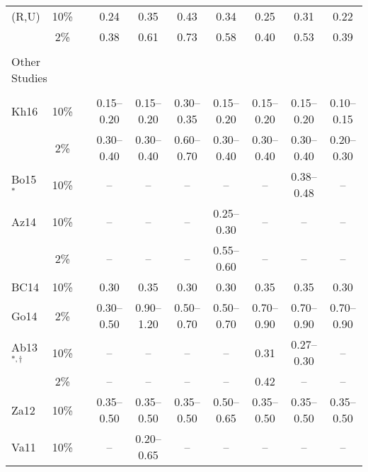 \begin{table*}[t]
\begin{tabular}{lccccccccc}
    (R,U)   &  10\%  &&   0.24      &   0.35      &   0.43      &   0.34      &   0.25      &   0.31      &   0.22      \\
            &   2\%  &&   0.38      &   0.61      &   0.73      &   0.58      &   0.40      &   0.53      &   0.39      \\
    \hline                                                                                                              \\[-1.6ex]
    \multicolumn{2}{l}{Other Studies}                                                                                   \\[0.6ex]
    \cline{1-2} \cline{4-10}                                                                                            \\[-1.6ex]
    Kh16    &  10\%  &&  0.15--0.20 & 0.15--0.20  & 0.30--0.35  & 0.15--0.20  & 0.15--0.20  & 0.15--0.20  & 0.10--0.15  \\
            &   2\%  &&  0.30--0.40 & 0.30--0.40  & 0.60--0.70  & 0.30--0.40  & 0.30--0.40  & 0.30--0.40  & 0.20--0.30  \\
    Bo15${}^{*}$
            &  10\%  &&   --        &   --        &   --        &   --        &   --        & 0.38--0.48  &   --        \\
    Az14    &  10\%  &&   --        &   --        &   --        & 0.25--0.30  &   --        &     --      &   --        \\
            &   2\%  &&   --        &   --        &   --        & 0.55--0.60  &   --        &     --      &   --        \\
    BC14    &  10\%  &&   0.30      &   0.35      &   0.30      &   0.30      &   0.35      &   0.35      &   0.30      \\
    Go14    &   2\%  && 0.30--0.50  & 0.90--1.20  & 0.50--0.70  & 0.50--0.70  & 0.70--0.90  & 0.70--0.90  & 0.70--0.90  \\
    Ab13${}^{*,\dagger}$
            &  10\%  &&   --        &   --        &   --        &   --        &   0.31      & 0.27--0.30  &   --        \\
            &   2\%  &&   --        &   --        &   --        &   --        &   0.42      &     --      &   --        \\
    Za12    &  10\%  && 0.35--0.50  & 0.35--0.50  & 0.35--0.50  & 0.50--0.65  & 0.35--0.50  & 0.35--0.50  & 0.35--0.50  \\
    Va11    &  10\%  &&   --        & 0.20--0.65  &   --        &   --        &   --        &     --      &     --      \\

\end{tabular}
\end{table*}
